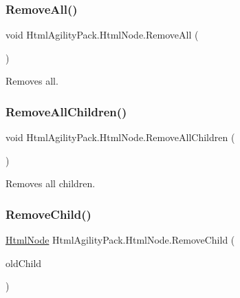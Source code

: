 \subsubsection{\texorpdfstring{Remove\+All()}{RemoveAll()}}
{\footnotesize\ttfamily void Html\+Agility\+Pack.\+Html\+Node.\+Remove\+All (\begin{DoxyParamCaption}{ }\end{DoxyParamCaption})\hspace{0.3cm}{\ttfamily [inline]}}



Removes all. 

\mbox{\label{class_html_agility_pack_1_1_html_node_ae565d81a4648fb3c6d5bd95fc91e2d29}} 
\subsubsection{\texorpdfstring{Remove\+All\+Children()}{RemoveAllChildren()}}
{\footnotesize\ttfamily void Html\+Agility\+Pack.\+Html\+Node.\+Remove\+All\+Children (\begin{DoxyParamCaption}{ }\end{DoxyParamCaption})\hspace{0.3cm}{\ttfamily [inline]}}



Removes all children. 

\mbox{\label{class_html_agility_pack_1_1_html_node_a100e3e038668cab3505109847ea8b075}} 
\subsubsection{\texorpdfstring{Remove\+Child()}{RemoveChild()}\hspace{0.1cm}{\footnotesize\ttfamily [1/2]}}
{\footnotesize\ttfamily \hyperlink{class_html_agility_pack_1_1_html_node}{Html\+Node} Html\+Agility\+Pack.\+Html\+Node.\+Remove\+Child (\begin{DoxyParamCaption}\item[{\hyperlink{class_html_agility_pack_1_1_html_node}{Html\+Node}}]{old\+Child }\end{DoxyParamCaption})\hspace{0.3cm}{\ttfamily [inline]}}



